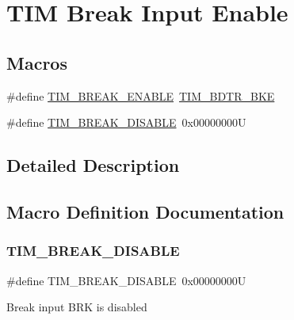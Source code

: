 \hypertarget{group___t_i_m___break___input__enable__disable}{}\section{T\+IM Break Input Enable}
\label{group___t_i_m___break___input__enable__disable}
\subsection*{Macros}
\begin{DoxyCompactItemize}
\item 
\#define \mbox{\hyperlink{group___t_i_m___break___input__enable__disable_ga3f966247b03532b8d93f9bddc032d863}{T\+I\+M\+\_\+\+B\+R\+E\+A\+K\+\_\+\+E\+N\+A\+B\+LE}}~\mbox{\hyperlink{group___peripheral___registers___bits___definition_ga74250b040dd9fd9c09dcc54cdd6d86d8}{T\+I\+M\+\_\+\+B\+D\+T\+R\+\_\+\+B\+KE}}
\item 
\#define \mbox{\hyperlink{group___t_i_m___break___input__enable__disable_ga8b34ce60f3f08c4b0d924a6546939994}{T\+I\+M\+\_\+\+B\+R\+E\+A\+K\+\_\+\+D\+I\+S\+A\+B\+LE}}~0x00000000U
\end{DoxyCompactItemize}


\subsection{Detailed Description}


\subsection{Macro Definition Documentation}
\mbox{\label{group___t_i_m___break___input__enable__disable_ga8b34ce60f3f08c4b0d924a6546939994}} 
\subsubsection{\texorpdfstring{TIM\_BREAK\_DISABLE}{TIM\_BREAK\_DISABLE}}
{\footnotesize\ttfamily \#define T\+I\+M\+\_\+\+B\+R\+E\+A\+K\+\_\+\+D\+I\+S\+A\+B\+LE~0x00000000U}

Break input B\+RK is disabled \mbox{\label{group___t_i_m___break___input__enable__disable_ga3f966247b03532b8d93f9bddc032d863}} 
